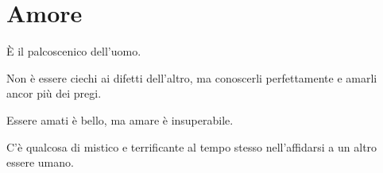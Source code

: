 \chapter{Amore}
\label{ch:amore}

È il palcoscenico dell'uomo.

Non è essere ciechi ai difetti dell'altro, ma conoscerli perfettamente e amarli
ancor più dei pregi.

Essere amati è bello, ma amare è insuperabile.

C'è qualcosa di mistico e terrificante al tempo stesso nell'affidarsi a un altro
essere umano.
